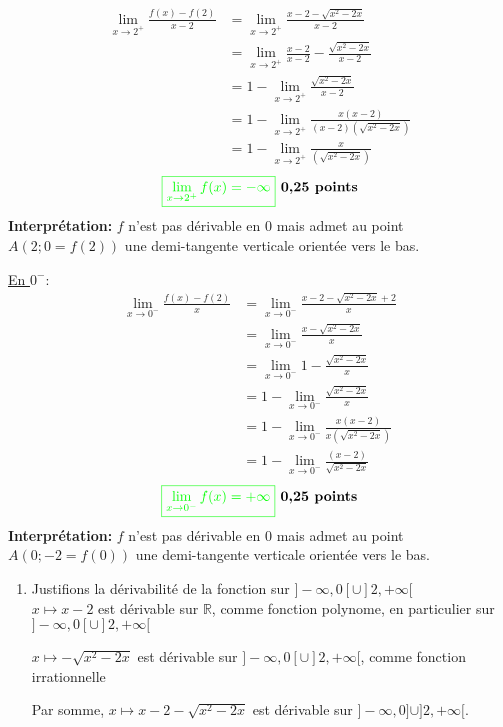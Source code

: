 \documentclass[12pt,a4paper]{article}
\begin{document}
\begin{enumerate}
\begin{align*}
\lim_{x \to 2^{+}} \frac{f(x)-f(2)}{x-2} &= \lim_{x \to 2^{+}}\frac{x - 2 - \sqrt{x^2 - 2x}}{x-2}\\
												&=\lim_{x \to 2^{+}} \frac{x - 2 }{x - 2 }-\frac{\sqrt{x^2 - 2x}}{x - 2 }\\
												&=1-\lim_{x \to 2^{+}}\frac{\sqrt{x^2 - 2x}}{x - 2 }\\
												&=1-\lim_{x \to 2^{+}}\frac{x(x - 2)}{ (x - 2)(\sqrt{x^2 - 2x}) }\\
												&=1-\lim_{x \to 2^{+}}\frac{x}{(\sqrt{x^2 - 2x}) }
\end{align*}
\[
\textcolor{green}{\boxed{ \lim_{x \to 2^{+}} f(x) =  -\infty }} \textbf{ 0,25 points}
\]
\textbf{Interprétation:} $f$ n'est pas dérivable en 0 mais admet au point $A(2;0=f(2))$ une demi-tangente verticale orientée vers le bas.

\underline{En $0^{-}:$}
\begin{align*}
\lim_{x \to 0^{-}} \frac{f(x)-f(2)}{x} &= \lim_{x \to 0^{-}}\frac{x - 2 - \sqrt{x^2 - 2x}+2}{x}\\
												&= \lim_{x \to 0^{-}}\frac{x - \sqrt{x^2 - 2x}}{x}\\
												&=\lim_{x \to 0^{-}} 1-\frac{\sqrt{x^2 - 2x}}{x}\\
												&=1-\lim_{x \to 0^{-}}\frac{\sqrt{x^2 - 2x}}{x}\\
												&=1-\lim_{x \to 0^{-}}\frac{x(x - 2)}{ x(\sqrt{x^2 - 2x}) }\\
												&=1-\lim_{x \to 0^{-}}\frac{(x - 2)}{\sqrt{x^2 - 2x}}
\end{align*}
\[
\textcolor{green}{\boxed{ \lim_{x \to 0^{-}} f(x) =  +\infty }} \textbf{ 0,25 points}
\]
\textbf{Interprétation:} $f$ n'est pas dérivable en 0 mais admet au point $A(0;-2=f(0))$ une demi-tangente verticale orientée vers le bas.
\begin{enumerate}
    \item Justifions la dérivabilité de la fonction sur \( ]-\infty, 0[ \cup ]2, +\infty[ \)\\
    
$ x \mapsto x - 2 $ est dérivable sur $\mathbb{R}$, comme fonction polynome, en particulier sur \( ]-\infty, 0[ \cup ]2, +\infty[ \)

$ x \mapsto - \sqrt{x^2 - 2x}$ est dérivable sur \( ]-\infty, 0[ \cup ]2, +\infty[ \), comme fonction irrationnelle

Par somme, $ x \mapsto x - 2 - \sqrt{x^2 - 2x}$ est dérivable sur \( ]-\infty, 0] \cup ]2, +\infty[ \).


\end{enumerate}
\end{enumerate}
\end{document}
